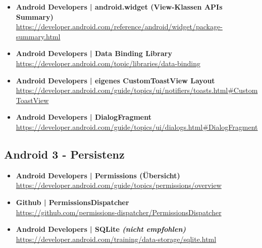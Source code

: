 \documentclass[a4paper]{article}
\begin{document}
{\begin{itemize}
		\item \textbf{Android Developers | android.widget (View-Klassen APIs Summary)}\\
		\href{https://developer.android.com/reference/android/widget/package-summary.html}
		{https://developer.android.com/reference/android/widget/package-summary.html}
		
		\item \textbf{Android Developers | Data Binding Library}\\
		\href{https://developer.android.com/topic/libraries/data-binding}
		{https://developer.android.com/topic/libraries/data-binding}
		
		\item \textbf{Android Developers | eigenes CustomToastView Layout}\\
		\href{https://developer.android.com/guide/topics/ui/notifiers/toasts.html#CustomToastView}
		{https://developer.android.com/guide/topics/ui/notifiers/toasts.html\#CustomToastView}
		
		\item \textbf{Android Developers | DialogFragment}\\
		\href{https://developer.android.com/guide/topics/ui/dialogs.html#DialogFragment}
		{https://developer.android.com/guide/topics/ui/dialogs.html\#DialogFragment}
		
		
	\end{itemize}
	
	\subsection{Android 3 - Persistenz}
	
	\begin{itemize}
		\item \textbf{Android Developers | Permissions (Übersicht)}\\
		\href{https://developer.android.com/guide/topics/permissions/overview}
		{https://developer.android.com/guide/topics/permissions/overview}
		
		\item \textbf{Github | PermissionsDispatcher}\\
		\href{https://github.com/permissions-dispatcher/PermissionsDispatcher}
		{https://github.com/permissions-dispatcher/PermissionsDispatcher}
		
		\item \textbf{Android Developers | SQLite \textit{(nicht empfohlen)}}\\
		\href{https://developer.android.com/training/data-storage/sqlite.html}
		{https://developer.android.com/training/data-storage/sqlite.html}
		

\end{itemize}}
\end{document}
